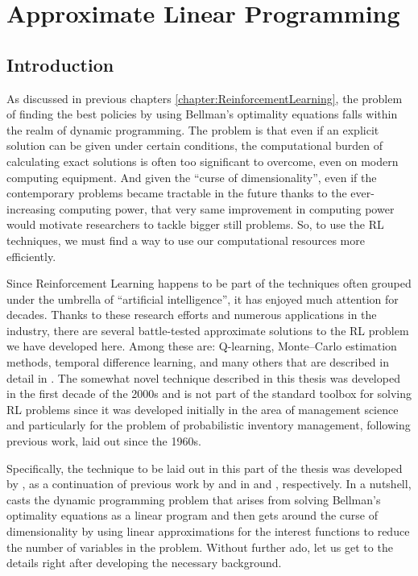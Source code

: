 \chapter{Approximate Linear Programming}
\label{chapter:ApproximateLinearP}
\section{Introduction}

As discussed in previous chapters \ref{chapter:ReinforcementLearning}, the
problem of finding the best policies by using Bellman's optimality equations
falls within the realm of dynamic programming. The problem is that even if an
explicit solution can be given under certain conditions, the computational
burden of calculating exact solutions is often too significant to overcome, even
on modern computing equipment. And given the ``curse of dimensionality'', even
if the contemporary problems became tractable in the future thanks to the
ever-increasing computing power, that very same improvement in computing power
would motivate researchers to tackle bigger still problems. So, to use the RL
techniques, we must find a way to use our computational resources more
efficiently. 

Since Reinforcement Learning happens to be part of the techniques often grouped
under the umbrella of ``artificial intelligence'', it has enjoyed much attention
for decades. Thanks to these research efforts and numerous applications in the
industry, there are several battle-tested approximate solutions to the RL
problem we have developed here. Among these are: Q-learning, Monte--Carlo
estimation methods, temporal difference learning, and many others that are
described in detail in \cite[Chapter~4]{SuttonBarto}. The somewhat novel
technique described in this thesis was developed in the first decade of the
2000s and is not part of the standard toolbox for solving RL problems since it
was developed initially in the area of management science and particularly for
the problem of probabilistic inventory management, following previous work,
laid out since the 1960s. 

Specifically, the technique to be laid out in this part of the thesis was
developed by \citeauthor*{farias2003LP2ADP}, as a continuation of previous work
by \citeauthor*{denardo1970} and \citeauthor*{depenoux1963} in
\cite{denardo1970} and \cite{depenoux1963}, respectively. In a nutshell,
\citeauthor*{farias2002thesis} casts the dynamic programming problem that arises
from solving Bellman's optimality equations as a linear program and then gets
around the curse of dimensionality by using linear approximations for the
interest functions to reduce the number of variables in the problem. Without
further ado, let us get to the details right after developing the necessary
background.


